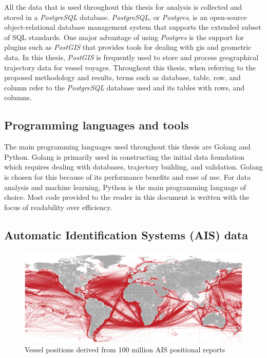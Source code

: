 All the data that is used throughout this thesis for analysis is collected and stored in a \textit{PostgreSQL} database. \textit{PostgreSQL}, or \textit{Postgres}, is an open-source object-relational database management system that supports the extended subset of SQL standards. One major advantage of using \textit{Postgres} is the support for plugins such as \textit{PostGIS} that provides tools for dealing with \acrshort{gis} and geometric data. In this thesis, \textit{PostGIS} is frequently used to store and process geographical trajectory data for vessel voyages. Throughout this thesis, when referring to the proposed methodology and results, terms such as database, table, row, and column refer to the \textit{PostgreSQL} database used and its tables with rows, and columns.

\subsection{Programming languages and tools}

The main programming languages used throughout this thesis are Golang and Python. Golang is primarily used in constructing the initial data foundation which requires dealing with databases, trajectory building, and validation. Golang is chosen for this because of its performance benefits and ease of use. For data analysis and machine learning, Python is the main programming language of choice. Most code provided to the reader in this document is written with the focus of readability over efficiency.

\subsection{Automatic Identification Systems (AIS) data}
\label{sec:ais_data}

\begin{figure}[htbp]  %
    \centering
    \includegraphics[width=1.0\textwidth]{figures/ais_history}
    \caption{Vessel positions derived from 100 million AIS positional reports}
    \label{fig:ais_positions}
\end{figure}


